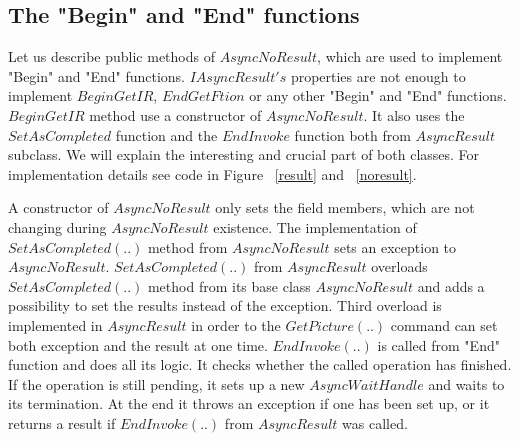 \documentclass[12pt,notitlepage]{report}
\begin{document}
\subsection*{The "Begin" and "End" functions} \label{sec:beginend}
	Let us describe public methods of $AsyncNoResult$, which are used to implement "Begin" and "End" functions.
	$IAsyncResult's$ properties are not enough to implement $BeginGetIR$,
	$EndGetFtion$ or any other "Begin" and "End" functions.
	$BeginGetIR$ method use a constructor of $AsyncNoResult$. It also uses the $SetAsCompleted$ function 
	and the $EndInvoke$ function both from $AsyncResult$ subclass.
	We will explain the interesting and crucial part of both classes. 
	For implementation details see code in Figure ~\ref{result} and ~\ref{noresult}.

	A constructor of $AsyncNoResult$ only sets the field members, 
	which are not changing during $AsyncNoResult$ existence.
	The implementation of $SetAsCompleted(..)$ method from $AsyncNoResult$ sets an exception to $AsyncNoResult$.
	$SetAsCompleted(..)$ from $AsyncResult$ overloads $SetAsCompleted(..)$ method
	from its base class $AsyncNoResult$ and adds a possibility to set the results instead of the exception.
	Third overload is implemented in $AsyncResult$ in order to the $GetPicture(..)$ command can set both 
	exception and the result at one time.
	$EndInvoke(..)$ is called from "End" function and does all its logic. It checks whether the called 
	operation has finished.	If the operation is still pending, it sets up a new $AsyncWaitHandle$
	and waits to its termination. At the end it throws an exception if one has been set up, 
	or it returns a result if $EndInvoke(..)$ from $AsyncResult$ was called.
\end{document}
